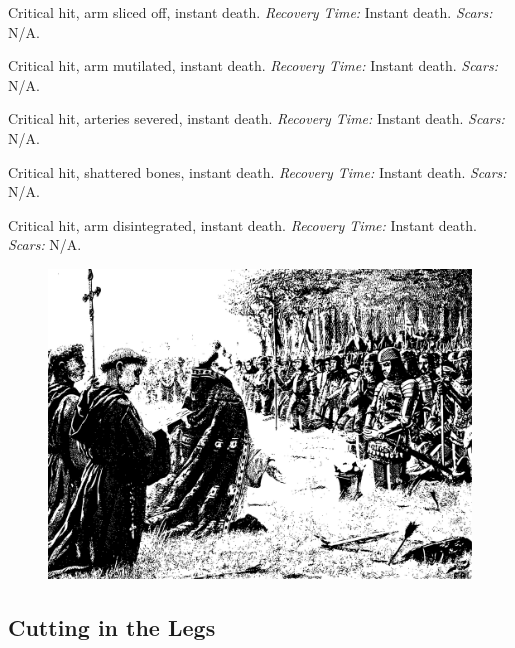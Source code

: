 \documentclass[12pt]{book}
\begin{document}
\begin{description}[labelwidth=1.5em, leftmargin=*, itemsep=0.4em]
    \item[16 -] Critical hit, arm sliced off, instant death. \textit{Recovery Time:} Instant death. \textit{Scars:} N/A.
    \item[17 -] Critical hit, arm mutilated, instant death. \textit{Recovery Time:} Instant death. \textit{Scars:} N/A.
    \item[18 -] Critical hit, arteries severed, instant death. \textit{Recovery Time:} Instant death. \textit{Scars:} N/A.
    \item[19 -] Critical hit, shattered bones, instant death. \textit{Recovery Time:} Instant death. \textit{Scars:} N/A.
    \item[20 -] Critical hit, arm disintegrated, instant death. \textit{Recovery Time:} Instant death. \textit{Scars:} N/A.
\end{description}

\begin{figure}[h]
    \centering
    \includegraphics[width=\textwidth]{./images/combat07.pdf}
\end{figure}

\subsection{Cutting in the Legs}
\end{document}
